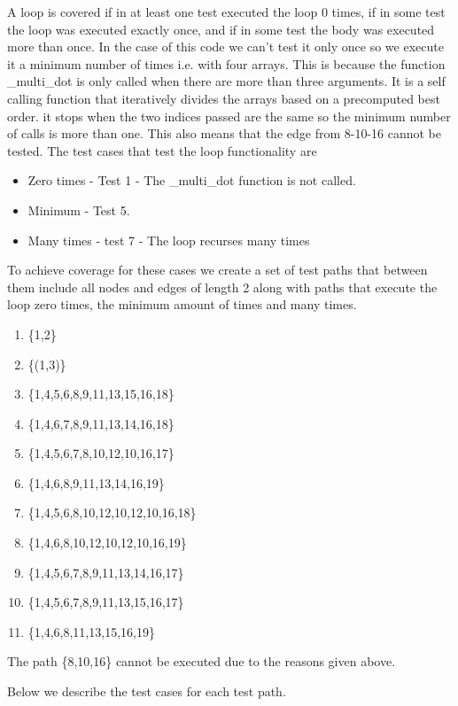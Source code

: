 A loop is covered if in at least one test executed the loop 0 times, if in some test the loop was executed exactly once, and if in some test the body was executed more than once. 
In the case of this code we can't test it only once so we execute it a minimum number of times i.e. with four arrays.
This is because the function \_multi\_dot is only called when there are more than three arguments. It is a self calling function that iteratively divides the arrays based on a precomputed best order. it stops when the two indices passed are the same so the minimum number of calls is more than one.
This also means that the edge from 8-10-16 cannot be tested.
The test cases that test the loop functionality are 
\begin{itemize}
\item Zero times - Test 1 - The \_multi\_dot function is not called.  
\item Minimum - Test 5.
\item Many times - test 7 - The loop recurses many times
\end{itemize}


To achieve coverage for these cases we create a set of test paths that between them include all nodes and edges of length 2 along with paths that execute the loop zero times, the minimum amount of times and many times. 

\begin{enumerate}
\item \{1,2\}
\item \{(1,3)\} 
\item \{1,4,5,6,8,9,11,13,15,16,18\}
\item \{1,4,6,7,8,9,11,13,14,16,18\}
\item \{1,4,5,6,7,8,10,12,10,16,17\}

\item \{1,4,6,8,9,11,13,14,16,19\}
\item \{1,4,5,6,8,10,12,10,12,10,16,18\}
\item \{1,4,6,8,10,12,10,12,10,16,19\}
\item \{1,4,5,6,7,8,9,11,13,14,16,17\} %
\item \{1,4,5,6,7,8,9,11,13,15,16,17\} %
\item \{1,4,6,8,11,13,15,16,19\} %


\end{enumerate}
The path \{8,10,16\} cannot be executed due to the reasons given above.

Below we describe the test cases for each test path.

